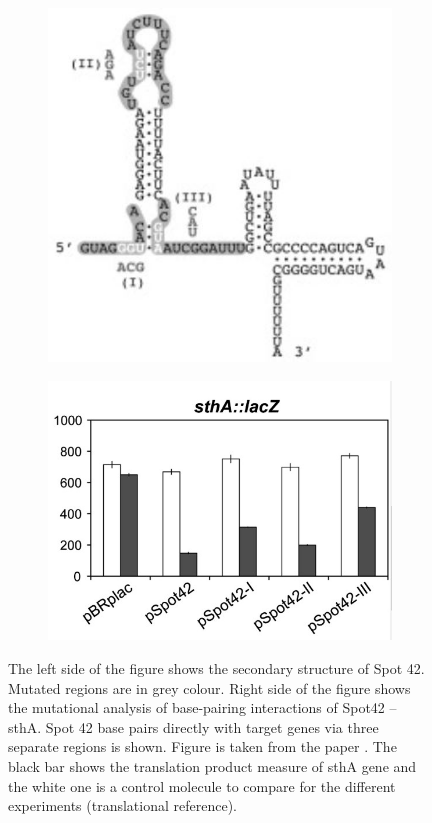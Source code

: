 \documentclass[twoside,a4paper]{report}
\numberwithin{equation}{section}
\begin{document}
	
	 \begin{figure}[h!tb]
		\centering
		\begin{subfigure}{.5\textwidth}
			\centering
			\includegraphics[width=.9\linewidth]{bei}		
			\label{fig:bei}
		\end{subfigure}%
		\begin{subfigure}{.5\textwidth}
			\centering
			\includegraphics[width=.8\linewidth]{spot42}	
			\label{fig:spot42}
		\end{subfigure}
	\caption{ The left side of the figure shows the secondary structure of Spot 42. Mutated regions are in grey colour. Right side of the figure shows the mutational analysis of base-pairing interactions of Spot42 – sthA. Spot 42 base pairs directly with target genes via three separate regions is shown. Figure is taken from the paper \citep{beisel2011base}. The black bar shows the translation product measure of sthA gene and the white one is a control molecule to compare for the different experiments (translational reference). }
	\label{fig:be}
\end{figure}
	
\end{document}
